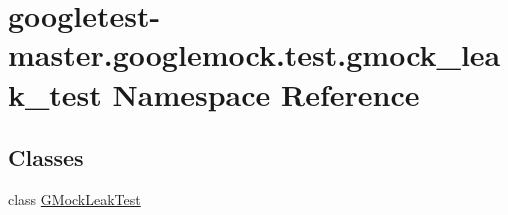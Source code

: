 \hypertarget{namespacegoogletest-master_1_1googlemock_1_1test_1_1gmock__leak__test}{}\section{googletest-\/master.googlemock.\+test.\+gmock\+\_\+leak\+\_\+test Namespace Reference}
\label{namespacegoogletest-master_1_1googlemock_1_1test_1_1gmock__leak__test}
\subsection*{Classes}
\begin{DoxyCompactItemize}
\item 
class \mbox{\hyperlink{classgoogletest-master_1_1googlemock_1_1test_1_1gmock__leak__test_1_1_g_mock_leak_test}{G\+Mock\+Leak\+Test}}
\end{DoxyCompactItemize}
